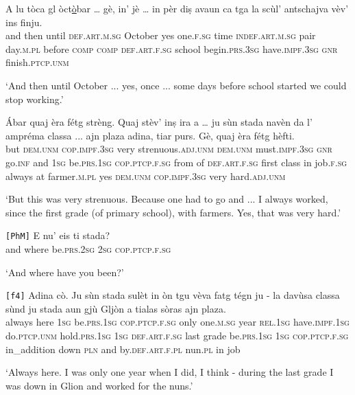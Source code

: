 \begin{linenumbers}
	\gll  A lu tòca gl òct\underline{ò}bar … gè, in' jè … in pèr diṣ avaun ca tga la scùl’ antschajva vèv’ ins finju.  \\
	and then until \textsc{def.art.m.sg} October {} yes one.\textsc{f.sg} time {} \textsc{indef.art.m.sg} pair day.\textsc{m.pl} before \textsc{comp} \textsc{comp} \textsc{def.art.f.sg} school begin.\textsc{prs.3sg} have.\textsc{impf.3sg} \textsc{gnr} finish.\textsc{ptcp.unm}\\
\end{linenumbers}
\medskip
\glt `And then until October ... yes, once ... some days before school started we could stop working.'
\medskip

\begin{linenumbers}
	\gll Ábar quaj èra fétg strèng. Quaj stèv’ inṣ ira a … ju sùn stada navèn da l' ampréma classa ... ajn plaza adina, tiar purs. Gè, quaj èra fétg hèfti.\\
	but \textsc{dem.unm} \textsc{cop.impf.3sg} very strenuous.\textsc{adj.unm} \textsc{dem.unm} must.\textsc{impf.3sg} \textsc{gnr} go.\textsc{inf} and {} \textsc{1sg} be.\textsc{prs.1sg} \textsc{cop.ptcp.f.sg} from of \textsc{def.art.f.sg} first class {} in job.\textsc{f.sg} always at farmer.\textsc{m.pl} yes \textsc{dem.unm} \textsc{cop.impf.3sg} very hard.\textsc{adj.unm}\\
\end{linenumbers}
\medskip
\glt `But this was very strenuous. Because one had to go and ... I always worked, since the first grade (of primary school), with farmers. Yes, that was very hard.'
\medskip

\begin{linenumbers}
	\gll \texttt{[PhM]} E nu’ eis ti stada?   \\
{}	and where be.\textsc{prs.2sg} \textsc{2sg} \textsc{cop.ptcp.f.sg}\\
\end{linenumbers}
\medskip
\glt `And where have you been?'
\medskip

\begin{linenumbers}
	\gll \texttt{[f4]} Adina cò. Ju sùn stada sulèt in òn tgu vèva fatg tégn ju - la davùsa classa sùnd ju stada aun gjù Gljòn a tialas sòras ajn plaza.\\
	{}  always here \textsc{1sg} be.\textsc{prs.1sg} \textsc{cop.ptcp.f.sg} only one.\textsc{m.sg} year \textsc{rel.1sg} have.\textsc{impf.1sg} do.\textsc{ptcp.unm} hold.\textsc{prs.1sg} \textsc{1sg} {} \textsc{def.art.f.sg} last grade be.\textsc{prs.1sg} \textsc{1sg} \textsc{cop.ptcp.f.sg} in\_addition down \textsc{pln} and by.\textsc{def.art.f.pl} nun.\textsc{pl} in job\\
\end{linenumbers}
\medskip
\glt `Always here. I was only one year when I did, I think - during the last grade I was down in Glion and worked for the nuns.'
\medskip

